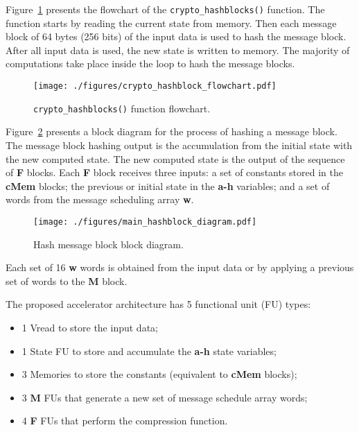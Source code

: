 Figure~\ref{fig:hash_flowchart} presents the flowchart of the
\texttt{crypto\_hashblocks()} function.
The function starts by reading the current state from memory. Then each message
block of 64 bytes (256 bits) of the input data is used to hash the message
block.
After all input data is used, the new state is written to memory.
The majority of computations take place inside the loop to hash the message
blocks.

\begin{figure}[!htbp]
    \centerline{\texttt{[image: ./figures/crypto\_hashblock\_flowchart.pdf]}}
    \vspace{0cm}\caption{\texttt{crypto\_hashblocks()} function flowchart.}
    \label{fig:hash_flowchart}
\end{figure}

Figure~\ref{fig:main_hashblock_diagram} presents a block diagram for the
process of hashing a message block.
The message block hashing output is the accumulation from the initial state
with the new computed state.
The new computed state is the output of the sequence of \textbf{F} blocks. Each
\textbf{F} block receives three inputs: a set of constants stored in the
\textbf{cMem} blocks; the previous or initial state in the \textbf{a-h}
variables; and a set of words from the message scheduling array \textbf{w}.

\begin{figure}[!htbp]
    \centerline{\texttt{[image: ./figures/main\_hashblock\_diagram.pdf]}}
    \vspace{0cm}\caption{Hash message block block diagram.}
    \label{fig:main_hashblock_diagram}
\end{figure}

Each set of 16 \textbf{w} words is obtained from the input data or by applying a
previous set of words to the \textbf{M} block.

The proposed accelerator architecture has 5 functional unit (FU) types:
\begin{itemize}
    \item 1 Vread to store the input data;
    \item 1 State FU to store and accumulate the \textbf{a-h} state variables;
    \item 3 Memories to store the constants (equivalent to \textbf{cMem}
        blocks);
    \item 3 \textbf{M} FUs that generate a new set of message schedule array
        words;
    \item 4 \textbf{F} FUs that perform the compression function.
\end{itemize}

